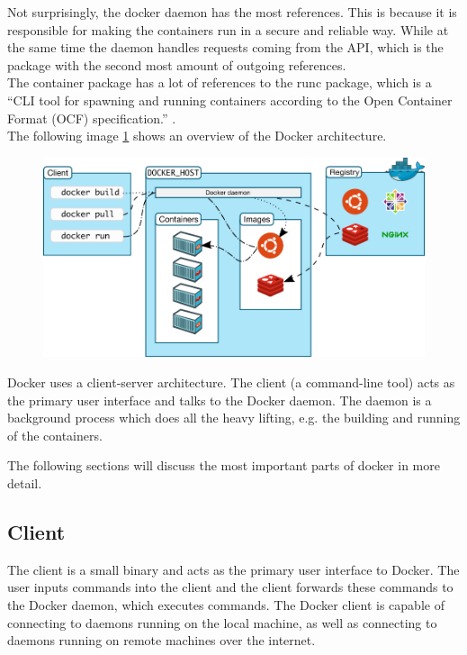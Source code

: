 Not surprisingly, the docker daemon has the most references. This is because it is responsible for making the containers run in a secure and reliable way. While at the same time the daemon handles requests coming from the API, which is the package with the second most amount of outgoing references.\\
The container package has a lot of references to the runc package, which is a ``CLI tool for spawning and running containers according to the Open Container Format (OCF) specification.'' \cite{opencontainersrunc}. \\


The following image \ref{fig:dockerarchipic} shows an overview of the Docker architecture.

\begin{figure}[H]
\centering
\includegraphics[scale=0.4]{4-softwarearch/images/architecture.png}
\label{fig:dockerarchipic}
\end{figure}
Docker uses a client-server architecture. The client (a command-line tool) acts as the primary user interface and talks to the Docker daemon. The daemon is a background process which does all the heavy lifting, e.g. the building and running of the containers.

The following sections will discuss the most important parts of docker in more detail.

\subsection{Client}
The client is a small binary and acts as the primary user interface to Docker. The user inputs commands into the client and the client forwards these commands to the Docker daemon, which executes commands.
The Docker client is capable of connecting to daemons running on the local machine, as well as connecting to daemons running on remote machines over the internet.

